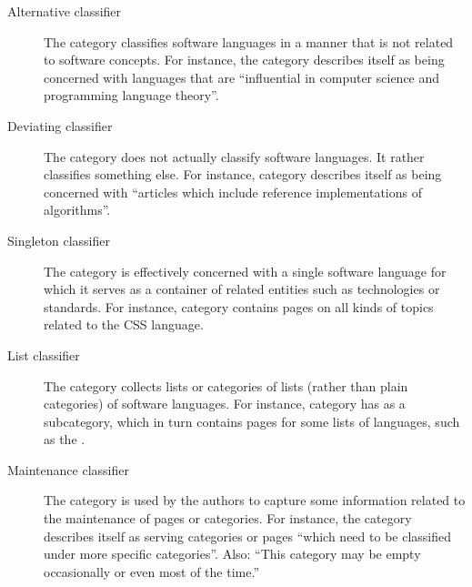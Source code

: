 {\small

\begin{description}

\item[Alternative classifier] The category classifies software languages in a manner that is not related to software concepts. For instance, the category  describes itself as being concerned with languages that are ``influential in computer science and programming language theory''.

\item[Deviating classifier] The category does not actually classify software languages. It rather classifies something else. For instance, category  describes itself as being concerned with ``articles which include reference implementations of algorithms''.

\item[Singleton classifier] The category is effectively concerned with a single software language for which it serves as a container of related entities such as technologies or standards. For instance, category  contains pages on all kinds of topics related to the CSS language.

\item[List classifier] The category collects lists or categories of lists (rather than plain categories) of software languages. For instance, category  has  as a subcategory, which in turn contains pages for some lists of languages, such as the .

\item[Maintenance classifier] The category is used by the \Wikipedia{} authors to capture some information related to the maintenance of pages or categories. For instance, the category  describes itself as serving categories or pages ``which need to be classified under more specific categories''. Also: ``This category may be empty occasionally or even most of the time.''


\end{description}

}

